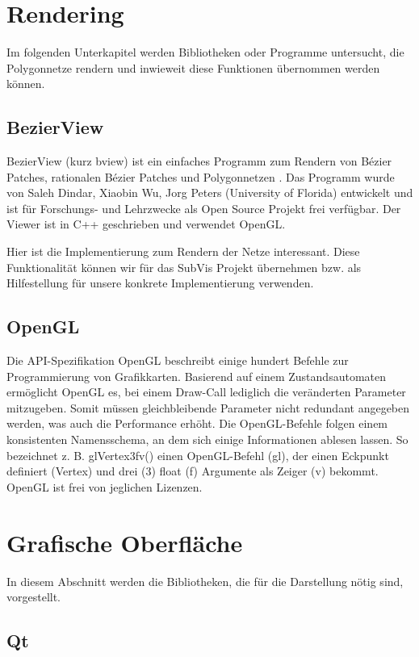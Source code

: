\section{Rendering}

Im folgenden Unterkapitel werden Bibliotheken oder Programme untersucht, die Polygonnetze rendern und inwieweit diese Funktionen übernommen werden können. 

\subsection{BezierView}

BezierView (kurz bview) ist ein einfaches Programm zum Rendern von Bézier Patches, rationalen Bézier Patches und Polygonnetzen \cite{Peters.bview.27.07.2015}.
Das Programm wurde von Saleh Dindar, Xiaobin Wu, Jorg Peters (University of Florida) entwickelt
und ist für Forschungs- und Lehrzwecke als Open Source Projekt
frei verfügbar.
Der Viewer ist in C++ geschrieben und verwendet OpenGL.

Hier ist die Implementierung zum Rendern der Netze interessant.
Diese Funktionalität können wir für das SubVis Projekt übernehmen bzw. als Hilfestellung für unsere
konkrete Implementierung verwenden.


\subsection{OpenGL}

Die API-Spezifikation OpenGL beschreibt einige hundert Befehle zur Programmierung von Grafikkarten.
Basierend auf einem Zustandsautomaten ermöglicht OpenGL es, bei einem Draw-Call lediglich die veränderten Parameter mitzugeben.
Somit müssen gleichbleibende Parameter nicht redundant angegeben werden, was auch die Performance erhöht.
Die OpenGL-Befehle folgen einem konsistenten Namensschema, an dem sich einige Informationen ablesen lassen. So bezeichnet z. B. glVertex3fv() einen OpenGL-Befehl (gl), der einen Eckpunkt definiert (Vertex) und drei (3) float (f) Argumente als Zeiger (v) bekommt.
OpenGL ist frei von jeglichen Lizenzen.

\section{Grafische Oberfläche}

In diesem Abschnitt werden die Bibliotheken, die für die Darstellung nötig sind, vorgestellt.

\subsection{Qt} %

